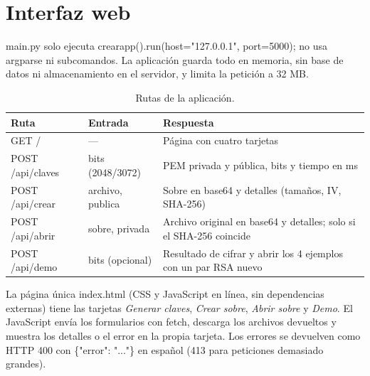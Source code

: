\documentclass[11pt,a4paper]{article}
\newcommand{\cod}[1]{{\ttfamily\let\_\relax\def\_{\textunderscore\penalty0\hskip0pt\relax}\def\/{\slash\penalty0\hskip0pt\relax}#1}}
\begin{document}
\section{Interfaz web}
\cod{main.py} solo ejecuta \cod{crear\_app().run(host="127.0.0.1", port=5000)}; no usa \cod{argparse} ni
subcomandos. La aplicación guarda todo en memoria, sin base de datos ni almacenamiento en el servidor, y limita
la petición a 32 MB.
\begin{table}[H]
\centering
\begin{tabular}{@{}llp{7.2cm}@{}}
\toprule
Ruta & Entrada & Respuesta \\ \midrule
\cod{GET /} & --- & Página con cuatro tarjetas \\
\cod{POST /api/claves} & \cod{bits} (2048/3072) & PEM privada y pública, bits y tiempo en ms \\
\cod{POST /api/crear} & \cod{archivo}, \cod{publica} & Sobre en base64 y detalles (tamaños, IV, SHA-256) \\
\cod{POST /api/abrir} & \cod{sobre}, \cod{privada} & Archivo original en base64 y detalles; solo si el SHA-256 coincide \\
\cod{POST /api/demo} & \cod{bits} (opcional) & Resultado de cifrar y abrir los 4 ejemplos con un par RSA nuevo \\ \bottomrule
\end{tabular}
\caption{Rutas de la aplicación.}
\end{table}
La página única \cod{index.html} (CSS y JavaScript en línea, sin dependencias externas) tiene las tarjetas
\emph{Generar claves}, \emph{Crear sobre}, \emph{Abrir sobre} y \emph{Demo}. El JavaScript envía los formularios
con \cod{fetch}, descarga los archivos devueltos y muestra los detalles o el error en la propia tarjeta. Los
errores se devuelven como HTTP 400 con \cod{\{"error": "..."\}} en español (413 para peticiones demasiado
grandes).
\end{document}
